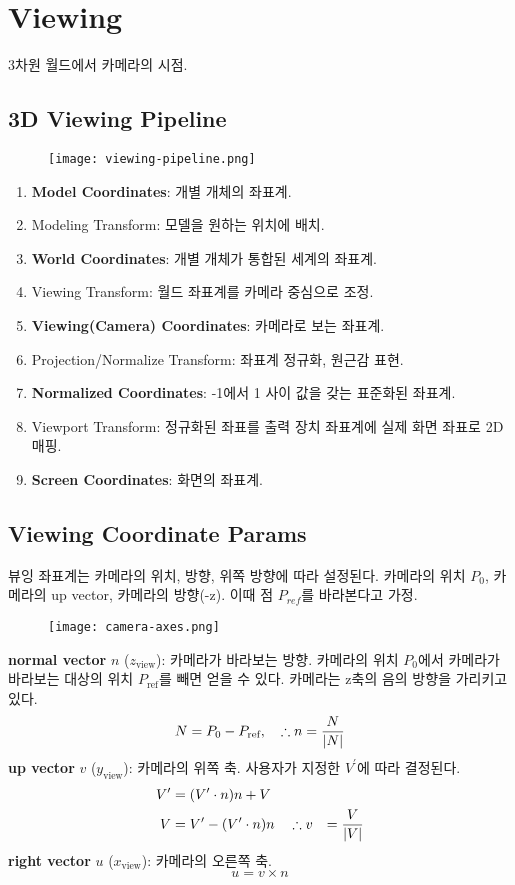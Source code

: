 \section{Viewing}

3차원 월드에서 카메라의 시점.

\subsection{3D Viewing Pipeline}

\begin{figure}[h]
  \centering
  \texttt{[image: viewing-pipeline.png]}
\end{figure}

\begin{enumerate}
  \item \textbf{Model Coordinates}: 개별 개체의 좌표계.
  \item Modeling Transform: 모델을 원하는 위치에 배치.
  \item \textbf{World Coordinates}: 개별 개체가 통합된 세계의 좌표계.
  \item Viewing Transform: 월드 좌표계를 카메라 중심으로 조정.
  \item \textbf{Viewing(Camera) Coordinates}: 카메라로 보는 좌표계.
  \item Projection/Normalize Transform: 좌표계 정규화, 원근감 표현.
  \item \textbf{Normalized Coordinates}: -1에서 1 사이 값을 갖는 표준화된 좌표계.
  \item Viewport Transform: 정규화된 좌표를 출력 장치 좌표계에 실제 화면 좌표로 2D 매핑.
  \item \textbf{Screen Coordinates}: 화면의 좌표계.
\end{enumerate}

\subsection{Viewing Coordinate Params}

뷰잉 좌표계는 카메라의 위치, 방향, 위쪽 방향에 따라 설정된다. 카메라의 위치 $P_0$, 카메라의 up vector, 카메라의 방향(-z). 이때 점 $P_{ref}$를 바라본다고 가정.
\begin{figure}[h]
  \centering
  \texttt{[image: camera-axes.png]}
\end{figure}
\textbf{normal vector} $n$ ($z_\text{view}$): 카메라가 바라보는 방향. 카메라의 위치 $P_0$에서 카메라가 바라보는 대상의 위치 $P_\text{ref}$를 빼면 얻을 수 있다. 카메라는 z축의 음의 방향을 가리키고 있다.
$$
N = P_0 - P_\text{ref}, \quad \therefore n = {N \over |N|}
$$
\textbf{up vector} $v$ ($y_\text{view}$): 카메라의 위쪽 축. 사용자가 지정한 $V^\prime$에 따라 결정된다.
$$
\begin{aligned}
  V^\prime &= (V^\prime \cdot n)n + V \\
  V &= V^\prime - (V^\prime \cdot n)n \quad \therefore v &= {V \over |V|}
\end{aligned}
$$
\textbf{right vector} $u$ ($x_\text{view}$): 카메라의 오른쪽 축.
$$
u = v \times n
$$

